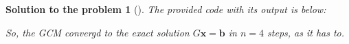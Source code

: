 \documentclass[12pt,a4]{article}
\newtheorem{solution}{Solution to the problem}
\newcommand{\grad}{\nabla}
\newcommand{\bb}{{\mathbf b}}
\newcommand{\bp}{{\mathbf p}}
\newcommand{\bx}{{\mathbf x}}
\begin{document}
\begin{solution}[] \rm The provided code with its output is below:

So, the GCM convergd to the exact solution $G\bx = \bb$ in $n=4$ steps, as it has to. 

\end{solution}
\end{document}
